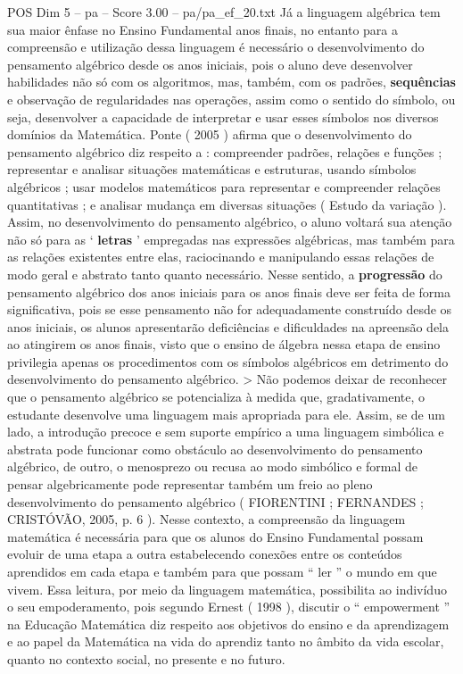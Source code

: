 \begin{textsample}{POS Dim 5 – pa – Score 3.00 – pa/pa\_ef\_20.txt}
Já a linguagem algébrica tem sua maior ênfase no Ensino Fundamental anos finais, no entanto para a compreensão e utilização dessa linguagem é necessário o desenvolvimento do pensamento algébrico desde os anos iniciais, pois o aluno deve desenvolver habilidades não só com os algoritmos, mas, também, com os padrões, \textbf{sequências} e observação de regularidades nas operações, assim como o sentido do símbolo, ou seja, desenvolver a capacidade de interpretar e usar esses símbolos nos diversos domínios da Matemática.
Ponte ( 2005 ) afirma que o desenvolvimento do pensamento algébrico diz respeito a : compreender padrões, relações e funções ; representar e analisar situações matemáticas e estruturas, usando símbolos algébricos ; usar modelos matemáticos para representar e compreender relações quantitativas ; e analisar mudança em diversas situações ( Estudo da variação ).
Assim, no desenvolvimento do pensamento algébrico, o aluno voltará sua atenção não só para as ‘ \textbf{letras} ’ empregadas nas expressões algébricas, mas também para as relações existentes entre elas, raciocinando e manipulando essas relações de modo geral e abstrato tanto quanto necessário.
Nesse sentido, a \textbf{progressão} do pensamento algébrico dos anos iniciais para os anos finais deve ser feita de forma significativa, pois se esse pensamento não for adequadamente construído desde os anos iniciais, os alunos apresentarão deficiências e dificuldades na apreensão dela ao atingirem os anos finais, visto que o ensino de álgebra nessa etapa de ensino privilegia apenas os procedimentos com os símbolos algébricos em detrimento do desenvolvimento do pensamento algébrico. > Não podemos deixar de reconhecer que o pensamento algébrico se potencializa à medida que, gradativamente, o estudante desenvolve uma linguagem mais apropriada para ele.
Assim, se de um lado, a introdução precoce e sem suporte empírico a uma linguagem simbólica e abstrata pode funcionar como obstáculo ao desenvolvimento do pensamento algébrico, de outro, o menosprezo ou recusa ao modo simbólico e formal de pensar algebricamente pode representar também um freio ao pleno desenvolvimento do pensamento algébrico ( FIORENTINI ; FERNANDES ; CRISTÓVÃO, 2005, p. 6 ).
Nesse contexto, a compreensão da linguagem matemática é necessária para que os alunos do Ensino Fundamental possam evoluir de uma etapa a outra estabelecendo conexões entre os conteúdos aprendidos em cada etapa e também para que possam “ ler ” o mundo em que vivem.
Essa leitura, por meio da linguagem matemática, possibilita ao indivíduo o seu empoderamento, pois segundo Ernest ( 1998 ), discutir o “ empowerment ” na Educação Matemática diz respeito aos objetivos do ensino e da aprendizagem e ao papel da Matemática na vida do aprendiz tanto no âmbito da vida escolar, quanto no contexto social, no presente e no futuro.

\end{textsample}
